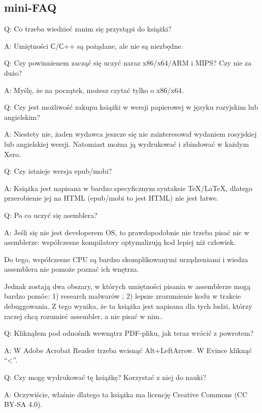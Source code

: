 \subsection*{mini-FAQ}

\par Q: Co trzeba wiedzieć zanim się przystąpi do książki?
\par A: Umiętności С/С++ są pożądane, ale nie są niezbędne.

\par Q: Czy powinnienem zacząć się uczyć naraz x86/x64/ARM i MIPS? Czy nie za dużo?
\par A: Myślę, że na początek, możesz czytać tylko o x86/x64.

\par Q: Czy jest możliwość zakupu książki w wersji papierowej w języku rozyjskim lub angielskim?
\par A: Niestety nie, żaden wydawca jeszcze się nie zainteresował wydaniem rosyjskiej lub angielskiej wersji. Natomiast można ją wydrukować i zbindować w każdym Xero.

\par Q: Czy istnieje wersja epub/mobi?
\par A: Książka jest napisana w bardzo specyficznym syntaksie TeX/LaTeX, dlatego przerobienie jej na HTML (epub/mobi to jest HTML)
nie jest łatwe.

\par Q: Po co uczyć się asemblera?
\par A: Jeśli się nie jest developerem \ac{OS}, to prawdopodobnie nie trzeba pisać nic w asemblerze: współczesne kompilatory optymalizują kod lepiej niż człowiek.

Do tego, współczesne \ac{CPU} są bardzo skomplikowanymi urządzeniami i wiedza assemblera nie pomoże poznać ich wnętrza.

Jednak zostają dwa obszary, w których umiętności pisania w assemblerze mogą bardzo pomóc:
1) research malwarów ; 2) lepsze zrozumienie kodu w trakcie debuggowania.
Z tego wynika, że ta książka jest napisana dla tych ludzi, którzy raczej chcą rozumieć assembler, a nie pisać w nim..

\par Q: Kliknąłem pod odnośnik wewnątrz PDF-pliku, jak teraz wrócić z powrotem?
\par A: W Adobe Acrobat Reader trzeba wcisnąć Alt+LeftArrow. W Evince kliknąć ``<''.

\par Q: Czy mogę wydrukować tę książkę? Korzystać z niej do nauki?
\par A: Oczywiście, właśnie dlatego ta książka ma licencję Creative Commons (CC BY-SA 4.0).

